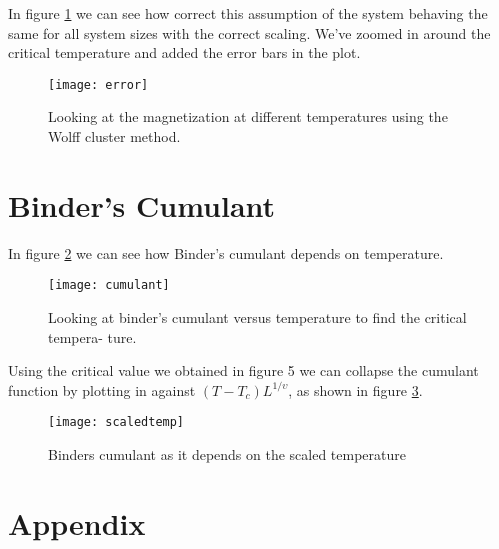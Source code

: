 \documentclass[11pt]{article}
\begin{document}
\newpage
In figure \ref{fig:error} we can see how correct this assumption of the system behaving the same
for all system sizes with the correct scaling. We've zoomed in around the critical temperature and added the error bars in the plot.
\begin{figure}[H]
	\centering
	\texttt{[image: error]}
	\caption{Looking at the magnetization at different temperatures using the Wolff cluster
method.}
	\label{fig:error}
\end{figure}


\section{Binder's Cumulant}

In figure \ref{fig:cumulant} we can see how Binder's cumulant depends on temperature.
\begin{figure}[H]
	\centering
	\texttt{[image: cumulant]}
	\caption{Looking at binder’s cumulant versus temperature to find the critical tempera-
ture.}
	\label{fig:cumulant}
\end{figure}

\newpage
Using the critical value we obtained in figure 5 we can collapse the cumulant function
by plotting in against $(T-T_c)L^{1 / \upsilon}$, as shown in figure \ref{fig:scaledtemp}.
\begin{figure}[H]
	\centering
	\texttt{[image: scaledtemp]}
	\caption{Binders cumulant as it depends on the scaled temperature}
	\label{fig:scaledtemp}
\end{figure}
\clearpage
\appendix
\section{Appendix}
\end{document}
